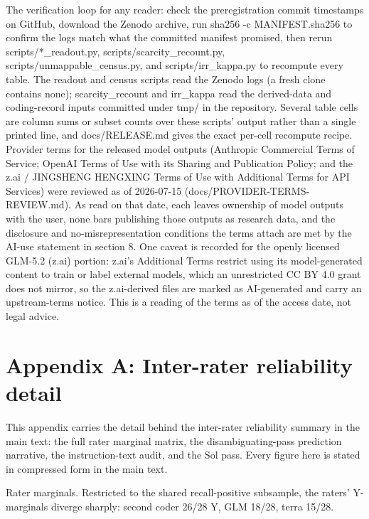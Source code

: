 \documentclass[11pt]{article}
\begin{document}
The verification loop for any reader: check the preregistration commit
timestamps on GitHub, download the Zenodo archive, run sha256 -c
MANIFEST.sha256 to confirm the logs match what the committed manifest
promised, then rerun scripts/*\_readout.py, scripts/scarcity\_recount.py, scripts/unmappable\_census.py, and scripts/irr\_kappa.py to recompute every table. The readout and census scripts read the Zenodo logs (a fresh clone contains none); scarcity\_recount and irr\_kappa read the derived-data and coding-record inputs committed under tmp/ in the repository. Several table cells are column sums or subset counts over these scripts' output rather than a single printed line, and docs/RELEASE.md gives the exact per-cell recompute recipe. Provider terms for the released model outputs (Anthropic Commercial Terms of Service; OpenAI Terms of Use with its Sharing and Publication Policy; and the z.ai / JINGSHENG HENGXING Terms of Use with Additional Terms for API Services) were reviewed as of 2026-07-15 (docs/PROVIDER-TERMS-REVIEW.md). As read on that date, each leaves ownership of model outputs with the user, none bars publishing those outputs as research data, and the disclosure and no-misrepresentation conditions the terms attach are met by the AI-use statement in section 8. One caveat is recorded for the openly licensed GLM-5.2 (z.ai) portion: z.ai's Additional Terms restrict using its model-generated content to train or label external models, which an unrestricted CC BY 4.0 grant does not mirror, so the z.ai-derived files are marked as AI-generated and carry an upstream-terms notice. This is a reading of the terms as of the access date, not legal advice.


\nocite{*}


\section*{Appendix A: Inter-rater reliability detail}

This appendix carries the detail behind the inter-rater reliability
summary in the main text: the full rater marginal matrix, the
disambiguating-pass prediction narrative, the instruction-text audit,
and the Sol pass. Every figure here is stated in compressed form in the
main text.

Rater marginals. Restricted to the shared recall-positive subsample, the
raters' Y-marginals diverge sharply: second coder 26/28 Y, GLM 18/28,
terra 15/28.
\end{document}
